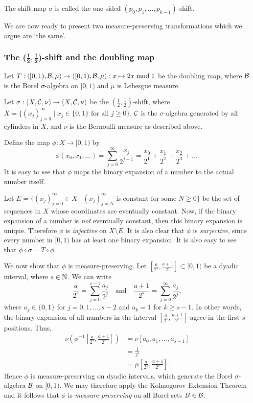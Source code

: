 The shift map $\sigma$ is called the one-sided $(p_0, p_1, \dots, p_{k - 1})$-shift.

We are now ready to present two measure-preserving transformations which we argue are `the same'.

\subsubsection{The \texorpdfstring{($\mathbf{\frac{1}{2}, \frac{1}{2}}$)}{(1/2, 1/2)}-shift and the doubling map}
Let $T : ([0, 1), \mathcal{B}, \mu) \to ([0, 1), \mathcal{B}, \mu) : x \mapsto 2x \bmod 1$ be the doubling map, where $\mathcal{B}$ is the Borel $\sigma$-algebra on $[0, 1)$ and $\mu$ is Lebesgue measure.

Let $\sigma : (X, \mathcal{C}, \nu) \to (X, \mathcal{C}, \nu)$ be the $(\frac{1}{2}, \frac{1}{2})$-shift, where $X = \{(x_j)_{j = 0}^\infty \mid x_j \in \{0, 1\} \text{ for all } j \geq 0\}$, $\mathcal{C}$ is the $\sigma$-algebra generated by all cylinders in $X$, and $\nu$ is the Bernoulli measure as described above.

Define the map $\phi : X \to [0, 1)$ by
\[
	\phi(x_0, x_1, \dots) = \sum_{j = 0}^\infty{\frac{x_j}{2^{j + 1}}} = \frac{x_0}{2^1} + \frac{x_1}{2^2} + \frac{x_2}{2^3} + \dots.
\]
It is easy to see that $\phi$ maps the binary expansion of a number to the actual number itself.

Let $E = \{(x_j)_{j = 0}^\infty \in X \mid (x_j)_{j = N}^\infty \text{ is constant for some } N \geq 0\}$ be the set of sequences in $X$ whose coordinates are eventually constant. Now, if the binary expansion of a number is \emph{not} eventually constant, then this binary expansion is unique. Therefore $\phi$ is \emph{injective} on $X \setminus E$. It is also clear that $\phi$ is \emph{surjective}, since every number in $[0, 1)$ has at least one binary expansion. It is also easy to see that $\phi \circ \sigma = T \circ \phi$.

We now show that $\phi$ is measure-preserving. Let $[\frac{a}{2^s}, \frac{a + 1}{2^s}] \subset [0, 1)$ be a dyadic interval, where $s \in \mathbb{N}$. We can write
\[
	\frac{a}{2^s} = \sum_{j = 0}^{s - 1}{\frac{a_j}{2^j}} \quad \text{and} \quad \frac{a + 1}{2^s} = \sum_{j = 0}^\infty{\frac{a_j}{2^j}},
\]
where $a_j \in \{0, 1\}$ for $j = 0, 1, \dots, s - 2$ and $a_k = 1$ for $k \geq s - 1$. In other words, the binary expansion of all numbers in the interval $[\frac{a}{2^s}, \frac{a + 1}{2^s}]$ agree in the first $s$ positions. Thus, \begin{align*}
	\nu\left(\phi^{-1}\left[\frac{a}{2^s}, \frac{a + 1}{2^s}\right]\right) &= \nu[a_0, a_1, \dots, a_{s - 1}] \\
		&= \frac{1}{2^s} \\
		&= \mu\left[\frac{a}{2^s}, \frac{a + 1}{2^s}\right].
\end{align*}
Hence $\phi$ is measure-preserving on dyadic intervals, which generate the Borel $\sigma$-algebra $\mathcal{B}$ on $[0, 1)$. We may therefore apply the Kolmogorov Extension Theorem and it follows that $\phi$ is \emph{measure-preserving} on all Borel sets $B \in \mathcal{B}$.

